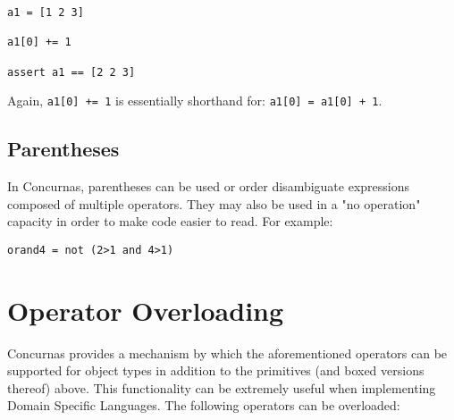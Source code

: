 \documentclass[conc-doc]{subfiles}
\begin{document}
\begin{lstlisting}
a1 = [1 2 3]

a1[0] += 1

assert a1 == [2 2 3]
\end{lstlisting}

Again, \lstinline{a1[0] += 1} is essentially shorthand for: \lstinline{a1[0] = a1[0] + 1}.

\subsection{Parentheses}
In Concurnas, parentheses can be used or order disambiguate expressions composed of multiple operators. They may also be used in a "no operation" capacity in order to make code easier to read. For example:

\begin{lstlisting}
orand4 = not (2>1 and 4>1)
\end{lstlisting}

\section{Operator Overloading}
\label{sec:OperatorOverloading}
Concurnas provides a mechanism by which the aforementioned operators can be supported for object types in addition to the primitives (and boxed versions thereof) above. This functionality can be extremely useful when implementing Domain Specific Languages. The following operators can be overloaded:
\end{document}
